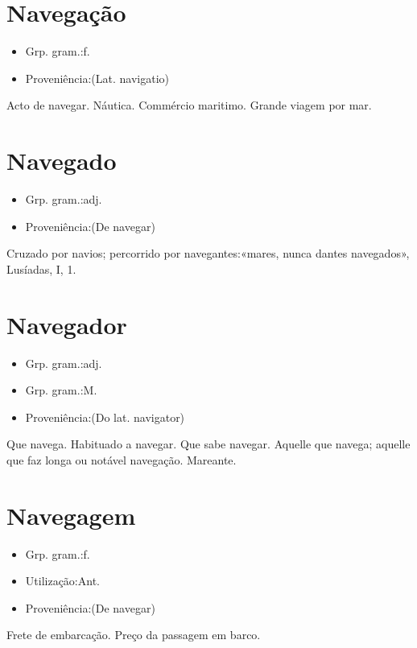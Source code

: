 \section{Navegação}
\begin{itemize}
\item {Grp. gram.:f.}
\end{itemize}
\begin{itemize}
\item {Proveniência:(Lat. \textunderscore navigatio\textunderscore )}
\end{itemize}
Acto de navegar.
Náutica.
Commércio maritimo.
Grande viagem por mar.
\section{Navegado}
\begin{itemize}
\item {Grp. gram.:adj.}
\end{itemize}
\begin{itemize}
\item {Proveniência:(De \textunderscore navegar\textunderscore )}
\end{itemize}
Cruzado por navios; percorrido por navegantes:«\textunderscore mares, nunca dantes navegados\textunderscore », \textunderscore Lusíadas\textunderscore , I, 1.
\section{Navegador}
\begin{itemize}
\item {Grp. gram.:adj.}
\end{itemize}
\begin{itemize}
\item {Grp. gram.:M.}
\end{itemize}
\begin{itemize}
\item {Proveniência:(Do lat. \textunderscore navigator\textunderscore )}
\end{itemize}
Que navega.
Habituado a navegar.
Que sabe navegar.
Aquelle que navega; aquelle que faz longa ou notável navegação.
Mareante.
\section{Navegagem}
\begin{itemize}
\item {Grp. gram.:f.}
\end{itemize}
\begin{itemize}
\item {Utilização:Ant.}
\end{itemize}
\begin{itemize}
\item {Proveniência:(De \textunderscore navegar\textunderscore )}
\end{itemize}
Frete de embarcação.
Preço da passagem em barco.
